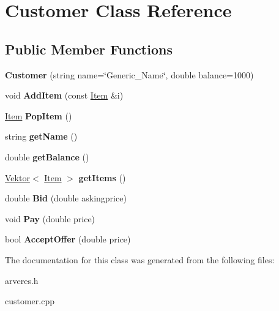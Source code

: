 \hypertarget{class_customer}{}\section{Customer Class Reference}
\label{class_customer}
\subsection*{Public Member Functions}
\begin{DoxyCompactItemize}
\item 
\mbox{\label{class_customer_a3f3d7a7d60033be426164e5c2ebc8d03}} 
{\bfseries Customer} (string name=\char`\"{}Generic\+\_\+\+Name\char`\"{}, double balance=1000)
\item 
\mbox{\label{class_customer_ad64efe7c94a7ceb4273d73f64fb87e98}} 
void {\bfseries Add\+Item} (const \mbox{\hyperlink{class_item}{Item}} \&i)
\item 
\mbox{\label{class_customer_a3dc2fd597c1ec0702568c5d530ab5335}} 
\mbox{\hyperlink{class_item}{Item}} {\bfseries Pop\+Item} ()
\item 
\mbox{\label{class_customer_a1bda0c5a9b2f4bf0c3314832e95f2566}} 
string {\bfseries get\+Name} ()
\item 
\mbox{\label{class_customer_a05d5c667fc315b1526b3975905cf4a67}} 
double {\bfseries get\+Balance} ()
\item 
\mbox{\label{class_customer_a171ab9483fc19833afe5c4f81550aa63}} 
\mbox{\hyperlink{class_vektor}{Vektor}}$<$ \mbox{\hyperlink{class_item}{Item}} $>$ {\bfseries get\+Items} ()
\item 
\mbox{\label{class_customer_a192a118708f65f164df92cd5c876f24a}} 
double {\bfseries Bid} (double askingprice)
\item 
\mbox{\label{class_customer_ad7553c88940f0d90b160208f9527dff0}} 
void {\bfseries Pay} (double price)
\item 
\mbox{\label{class_customer_ad953f76f5955b0eccb3229a559103e12}} 
bool {\bfseries Accept\+Offer} (double price)
\end{DoxyCompactItemize}


The documentation for this class was generated from the following files\+:\begin{DoxyCompactItemize}
\item 
arveres.\+h\item 
customer.\+cpp\end{DoxyCompactItemize}
